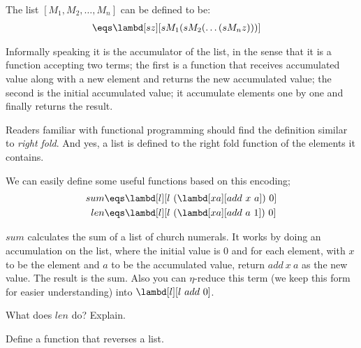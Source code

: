 \documentclass[../../../include/open-logic-section]{subfiles}
\begin{document}

The list $[M_1, M_2, \ldots, M_n]$ can be defined to be:
\begin{align*}
  [M_1, M_2, \ldots, M_n] &\eqs \lambd[sz][s M_1 (s M_2 (\ldots (s M_n z)))]
\end{align*}

Informally speaking it is the accumulator of the list, in the sense
that it is a function accepting two terms; the first is a function that receives accumulated value
along with a new element and returns the new accumulated value; the
second is the initial accumulated value; it accumulate elements one by
one and finally returns the result.

\begin{digress}
  Readers familiar with functional programming should find the
  definition similar to \emph{right fold}. And yes, a list is defined
  to the right fold function of the elements it contains.
\end{digress}

We can easily define some useful functions based on this encoding; 
\begin{align*}
  {sum} &\eqs \lambd[l][l ~ (\lambd[xa][add ~ x ~ a])~  0]\\
  len &\eqs \lambd[l][l ~ (\lambd[xa][add ~ a ~ 1]) ~ 0]
\end{align*}

$sum$ calculates the sum of a list of church numerals. It works by
doing an accumulation on the list, where the initial value is $0$ and
for each element, with $x$ to be the element and $a$ to be the
accumulated value, return $add ~ x ~ a$ as the new value. The result
is the sum. Also you can $\eta$-reduce this term (we keep this form for
easier understanding) into $\lambd[l][l ~ add ~ 0]$.

\begin{prob}
  What does $len$ do? Explain.
\end{prob}

\begin{prob}
  Define a function that reverses a list.
\end{prob}
\end{document}
